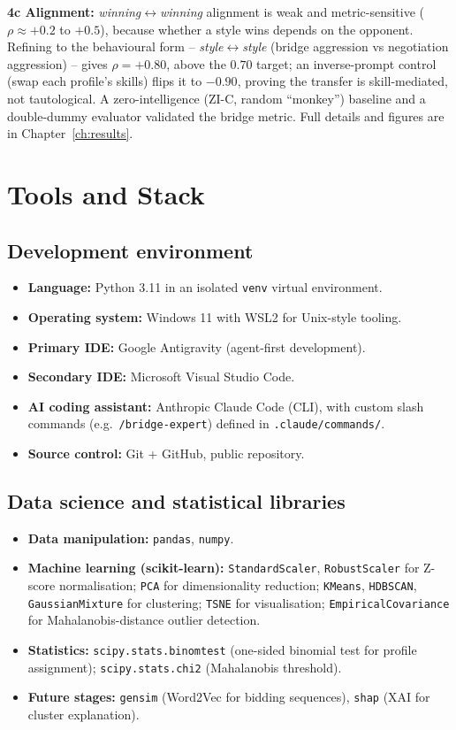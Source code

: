 \documentclass[11pt, a4paper, oneside, openany]{report}
\begin{document}
\textbf{4c Alignment:} \emph{winning}$\leftrightarrow$\emph{winning} alignment is weak and metric-sensitive ($\rho \approx +0.2$ to $+0.5$), because whether a style wins depends on the opponent. Refining to the behavioural form -- \emph{style}$\leftrightarrow$\emph{style} (bridge aggression vs negotiation aggression) -- gives \textbf{$\rho = +0.80$}, above the $0.70$ target; an inverse-prompt control (swap each profile's skills) flips it to $-0.90$, proving the transfer is skill-mediated, not tautological. A zero-intelligence (ZI-C, random ``monkey'') baseline and a double-dummy evaluator validated the bridge metric. Full details and figures are in Chapter~\ref{ch:results}.

\section{Tools and Stack}

\subsection*{Development environment}
\begin{itemize}[leftmargin=*]
    \item \textbf{Language:} Python 3.11 in an isolated \texttt{venv} virtual environment.
    \item \textbf{Operating system:} Windows 11 with WSL2 for Unix-style tooling.
    \item \textbf{Primary IDE:} Google Antigravity (agent-first development).
    \item \textbf{Secondary IDE:} Microsoft Visual Studio Code.
    \item \textbf{AI coding assistant:} Anthropic Claude Code (CLI), with custom slash commands (e.g.\ \texttt{/bridge-expert}) defined in \texttt{.claude/commands/}.
    \item \textbf{Source control:} Git + GitHub, public repository.
\end{itemize}

\subsection*{Data science and statistical libraries}
\begin{itemize}[leftmargin=*]
    \item \textbf{Data manipulation:} \texttt{pandas}, \texttt{numpy}.
    \item \textbf{Machine learning (scikit-learn):} \texttt{StandardScaler}, \texttt{RobustScaler} for Z-score normalisation; \texttt{PCA} for dimensionality reduction; \texttt{KMeans}, \texttt{HDBSCAN}, \texttt{GaussianMixture} for clustering; \texttt{TSNE} for visualisation; \texttt{EmpiricalCovariance} for Mahalanobis-distance outlier detection.
    \item \textbf{Statistics:} \texttt{scipy.stats.binomtest} (one-sided binomial test for profile assignment); \texttt{scipy.stats.chi2} (Mahalanobis threshold).
    \item \textbf{Future stages:} \texttt{gensim} (Word2Vec for bidding sequences), \texttt{shap} (XAI for cluster explanation).
\end{itemize}
\end{document}
